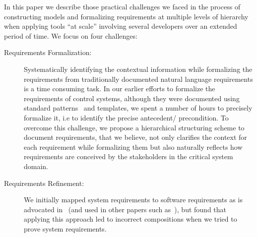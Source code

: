 In this paper we describe those practical challenges we faced in the process of constructing models and formalizing requirements at multiple levels of hierarchy when applying tools ``at scale'' involving several developers over an extended period of time.  We focus on four challenges:
\begin{description}
    \item[Requirements Formalization:] Systematically identifying the contextual information while formalizing the requirements from traditionally documented natural language requirements is a time consuming task. In our earlier efforts to formalize the requirements of control systems, although they were documented using standard patterns~\cite{mavin2009easy} and templates, we spent a number of hours to precisely formalize it, i.e to identify the precise antecedent/ precondition. To overcome this challenge, we propose a hierarchical structuring scheme to document requirements, that we believe, not only clarifies the context for each requirement while formalizing them but also naturally reflects how requirements are conceived by the stakeholders in the critical system domain. %
    \item[Requirements Refinement:]  We initially mapped system requirements to software requirements as is advocated in~\cite{Miller01:dasc} (and used in other papers such as~\cite{Jeffords:2010:MCV:1938390.1938407,Kauppinen07:re}), but found that applying this approach led to incorrect compositions when we tried to prove system requirements.

\end{description}
